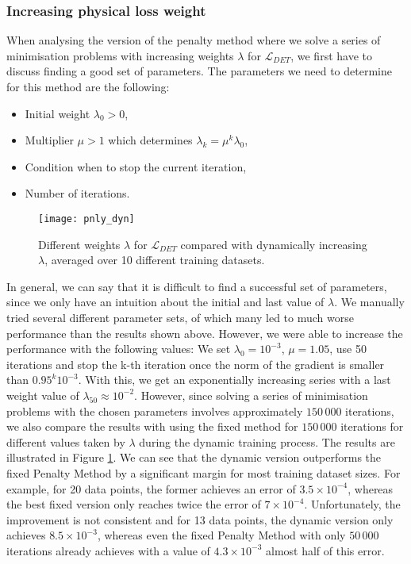 \subsubsection{Increasing physical loss weight}
When analysing the version of the penalty method where we solve a series of minimisation problems with increasing weights $\lambda$ for $\mathcal{L}_{DET}$, we first have to discuss finding a good set of parameters. The parameters we need to determine for this method are the following:
\begin{itemize}
	\item Initial weight $\lambda_0 > 0$,
	\item Multiplier $\mu > 1$ which determines $\lambda_k = \mu^k\lambda_0$,
	\item Condition when to stop the current iteration,
	\item Number of iterations.
\end{itemize}
\begin{figure}[H]
	\centering
	\texttt{[image: pnly\_dyn]}
	\caption{Different weights $\lambda$ for $\mathcal{L}_{DET}$ compared with dynamically increasing $\lambda$, averaged over 10 different training datasets.}
	\label{fig:pnly_dyn}
\end{figure}
In general, we can say that it is difficult to find a successful set of parameters, since we only have an intuition about the initial and last value of $\lambda$. We manually tried several different parameter sets, of which many led to much worse performance than the results shown above. However, we were able to increase the performance with the following values: We set $\lambda_0 = 10^{-3}$, $\mu = 1.05$, use 50 iterations and stop the k-th iteration once the norm of the gradient is smaller than $0.95^{k} 10^{-3}$. With this, we get an exponentially increasing series with a last weight value of $\lambda_{50} \approx 10^{-2}$. However, since solving a series of minimisation problems with the chosen parameters involves approximately $150\,000$ iterations, we also compare the results with using the fixed method for $150\,000$ iterations for different values taken by $\lambda$ during the dynamic training process. The results are illustrated in Figure \ref{fig:pnly_dyn}. We can see that the dynamic version outperforms the fixed Penalty Method by a significant margin for most training dataset sizes. For example, for 20 data points, the former achieves an error of $3.5\times 10^{-4}$, whereas the best fixed version only reaches twice the error of $7\times 10^{-4}$. Unfortunately, the improvement is not consistent and for 13 data points, the dynamic version only achieves $8.5 \times 10^{-3}$, whereas even the fixed Penalty Method with only $50\,000$ iterations already achieves with a value of $4.3 \times 10^{-3}$ almost half of this error.

